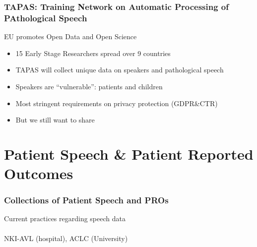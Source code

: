 \documentclass[xcolor=dvipsnames]{beamer}
\begin{document}
\begin{frame}
	\frametitle{TAPAS: Training Network on Automatic Processing of PAthological Speech}
	
	\begin{block}{EU promotes Open Data and Open Science}
	\begin{itemize}
	\item 15 Early Stage Researchers spread over 9 countries
	\item TAPAS will collect unique data on speakers and pathological speech 
	\item Speakers are ``vulnerable'': patients and children
	\item Most stringent requirements on privacy protection (GDPR\&CTR)
	\item But we still want to share
	\end{itemize}
	\end{block}	
	
\end{frame}

\section{Patient Speech \& Patient Reported Outcomes}

{
\begin{frame}
	\frametitle{Collections of Patient Speech and PROs}
	
	\vskip 5cm
	\begin{center}
	{\Large Current practices regarding speech data\\~\\{\footnotesize NKI-AVL (hospital), ACLC (University)}}
	\end{center}
\end{frame}
}
\end{document}
